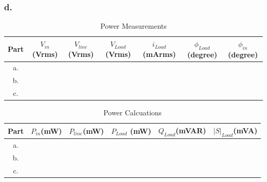 \documentclass[letterpaper,12pt]{article}
\begin{document}
\subsubsection{d.}

\begin{table}[H]
    \begin{center}
        \caption{Power Measurements}
        \vspace{2mm}
        \begin{tabular}{||c | c | c | c | c | c | c ||} 
            \hline
            Part & \(V_{in}\)\newline (Vrms) & \(V_{line}\)\newline (Vrms) & \(V_{Load}\) \newline (Vrms) &\(i_{Load}\)\newline (mArms) & \(\phi_{Load}\)\newline(degree) &\(\phi_{in}\)\newline(degree)  \\ [0.5ex] 
            \hline\hline
            a. & &  & & & &   \\ 
            \hline
            b. & &  & & & &    \\
            \hline
            c. & &  & & & &   \\ [1ex] 
            \hline
        \end{tabular}
\end{center}
\end{table}


\begin{table}[H]
    \begin{center}
        \caption{Power Calcuations}
        \vspace{2mm}
        \begin{tabular}{||c | c | c | c | c | c ||} 
            \hline
            Part & \(P_{in}\)\newline (mW) & \(P_{line}\)\newline (mW) & \(P_{Load}\) \newline (mW) &\(Q_{Load}\)\newline (mVAR) & \(|S|_{Load}\)\newline(mVA)   \\ [0.5ex] 
            \hline\hline
            a. & &  & & &    \\ 
            \hline
            b. & &  & & &     \\
            \hline
            c. & &  & & &    \\ [1ex] 
            \hline
        \end{tabular}
\end{center}
\end{table}
\end{document}
